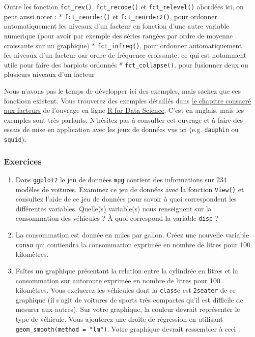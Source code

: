 \documentclass[a4paperpaper,]{article}
\theoremstyle{definition}
\theoremstyle{definition}
\theoremstyle{definition}
\theoremstyle{remark}
\begin{document}
Outre les fonction \texttt{fct\_rev()}, \texttt{fct\_recode()} et
\texttt{fct\_relevel()} abordées ici, on peut aussi noter : *
\texttt{fct\_reorder()} et \texttt{fct\_reorder2()}, pour ordonner
automatiquement les niveaux d'un facteur en fonction d'une autre
variable numerique (pour avoir par exemple des séries rangées par ordre
de moyenne croissante sur un graphique) * \texttt{fct\_infreq()}, pour
ordonner automatiquement les niveaux d'un facteur oar ordre de fréquence
croissante, ce qui est notamment utile pour faire des barplots ordonnés
* \texttt{fct\_collapse()}, pour fusionner deux ou plusieurs niveaux
d'un facteur

Nous n'avons pas le temps de développer ici des exemples, mais sachez
que ces fonctiosn existent. Vous trouverez des exemples détaillés dans
\href{http://r4ds.had.co.nz/factors.html\#modifying-factor-levels}{le
chapitre consacré aux facteurs} de l'ouvrage en ligne
\href{http://r4ds.had.co.nz/}{R for Data Science}. C'est en anglais,
mais les exemples sont très parlants. N'hésitez pas à consulter cet
ouvrage et à faire des essais de mise en application avec les jeux de
données vus ici (e.g. \texttt{dauphin} ou \texttt{squid}).

\subsubsection{Exercices}\label{exercices-10}

\begin{enumerate}
\def\labelenumi{\arabic{enumi}.}
\item
  Dans \texttt{ggplot2} le jeu de données \texttt{mpg} contient des
  informations sur 234 modèles de voitures. Examinez ce jeu de données
  avec la fonction \texttt{View()} et consultez l'aide de ce jeu de
  données pour savoir à quoi correspondent les différentes variables.
  Quelle(s) variable(s) nous renseignent sur la consommation des
  véhicules ? À quoi correspond la variable \texttt{disp} ?
\item
  La consommation est donnée en miles par gallon. Créez une nouvelle
  variable \texttt{conso} qui contiendra la consommation exprimée en
  nombre de litres pour 100 kilomètres.
\item
  Faîtes un graphique présentant la relation entre la cylindrée en
  litres et la consommation sur autoroute exprimée en nombre de litres
  pour 100 kilomètres. Vous excluerez les véhicules dont la
  \texttt{class}e est \texttt{2seater} de ce graphique (il s'agit de
  voitures de sports très compactes qu'il est difficile de mesurer aux
  autres). Sur votre graphique, la couleur devrait représenter le type
  de véhicule. Vous ajouterez une droite de régression en utilisant
  \texttt{geom\_smooth(method\ =\ "lm")}. Votre graphique devrait
  ressembler à ceci :
\end{enumerate}
\end{document}

